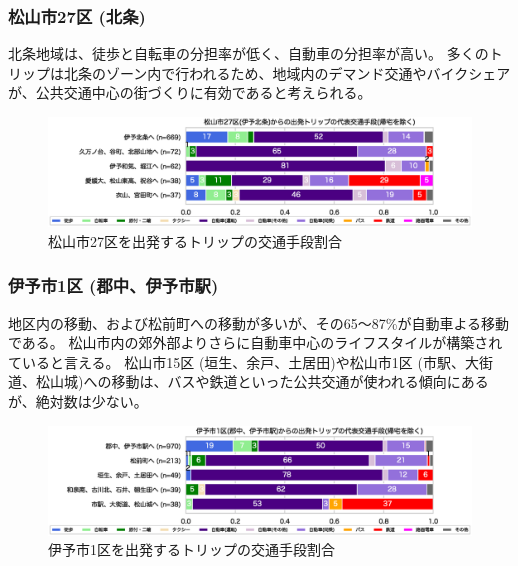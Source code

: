 \documentclass[a4paper,12pt, uplatex]{jsbook}
\begin{document}
\subsubsection{松山市27区 (北条)}
北条地域は、徒歩と自転車の分担率が低く、自動車の分担率が高い。
多くのトリップは北条のゾーン内で行われるため、地域内のデマンド交通やバイクシェアが、公共交通中心の街づくりに有効であると考えられる。
%
\begin{figure}[H]
    \centering
    \includegraphics[width=1.0\textwidth]{picture/mode_share_松山市27区.eps}
    \caption{松山市27区を出発するトリップの交通手段割合}
    \label{fig:mode_share_27}
\end{figure}

\subsubsection{伊予市1区 (郡中、伊予市駅)}
地区内の移動、および松前町への移動が多いが、その65〜87\%が自動車よる移動である。
松山市内の郊外部よりさらに自動車中心のライフスタイルが構築されていると言える。
松山市15区 (垣生、余戸、土居田)や松山市1区 (市駅、大街道、松山城)への移動は、バスや鉄道といった公共交通が使われる傾向にあるが、絶対数は少ない。
%
\begin{figure}[H]
    \centering
    \includegraphics[width=1.0\textwidth]{picture/mode_share_伊予市1区.eps}
    \caption{伊予市1区を出発するトリップの交通手段割合}
    \label{fig:mode_share_iyo1}
\end{figure}
\end{document}
